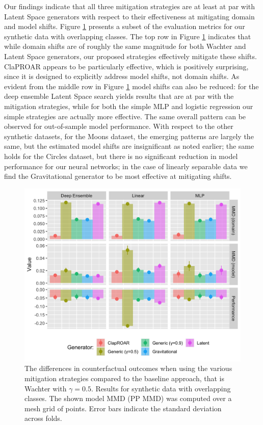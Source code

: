 \documentclass[conference,final,]{IEEEtran}
\theoremstyle{definition}
\theoremstyle{definition}
\theoremstyle{definition}
\theoremstyle{definition}
\theoremstyle{remark}
\begin{document}
Our findings indicate that all three mitigation strategies are at least at par with Latent Space generators with respect to their effectiveness at mitigating domain and model shifts. Figure \ref{fig:mitigate-results} presents a subset of the evaluation metrics for our synthetic data with overlapping classes. The top row in Figure \ref{fig:mitigate-results} indicates that while domain shifts are of roughly the same magnitude for both Wachter and Latent Space generators, our proposed strategies effectively mitigate these shifts. ClaPROAR appears to be particularly effective, which is positively surprising, since it is designed to explicitly address model shifts, not domain shifts. As evident from the middle row in Figure \ref{fig:mitigate-results} model shifts can also be reduced: for the deep ensemble Latent Space search yields results that are at par with the mitigation strategies, while for both the simple MLP and logistic regression our simple strategies are actually more effective. The same overall pattern can be observed for out-of-sample model performance. With respect to the other synthetic datasets, for the Moons dataset, the emerging patterns are largely the same, but the estimated model shifts are insignificant as noted earlier; the same holds for the Circles dataset, but there is no significant reduction in model performance for our neural networks; in the case of linearly separable data we find the Gravitational generator to be most effective at mitigating shifts.

\begin{figure}

{\centering \includegraphics[width=0.9\linewidth]{www/mitigation_synthetic_results} 

}

\caption{The differences in counterfactual outcomes when using the various mitigation strategies compared to the baseline approach, that is Wachter with $\gamma=0.5$. Results for synthetic data with overlapping classes. The shown model MMD (PP MMD) was computed over a mesh grid of points. Error bars indicate the standard deviation across folds.}\label{fig:mitigate-results}
\end{figure}
\end{document}

